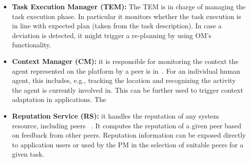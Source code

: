 \begin{itemize}
\item \textbf{Task Execution Manager (TEM):} %
The TEM is in charge of managing the task execution phase. In particular it monitors whether the task execution is in line with expected plan (taken from the task description). In case a deviation is detected, it might trigger a re-planning by using OM's functionality. 

\item \textbf{Context Manager (CM):} it is responsible for monitoring the context the agent represented on the platform by a peer is in~\cite{D3.2}. For an individual human agent, this includes, e.g., tracking the location and recognizing the activity the agent is currently involved in. This can be further used to trigger context adaptation in applications. The %

\item \textbf{Reputation Service (RS):} it handles the reputation of any system resource, including peers ~\cite{D2.3}. It computes the reputation of a given peer based on feedback from other peers. %
Reputation information can be exposed directly to application users or used by the PM in the selection of suitable peers for a given task. %



\end{itemize}
